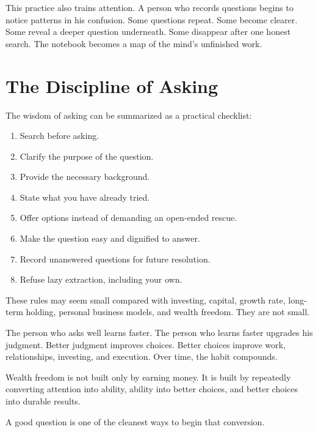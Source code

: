 This practice also trains attention. A person who records questions begins to notice patterns in his confusion. Some questions repeat. Some become clearer. Some reveal a deeper question underneath. Some disappear after one honest search. The notebook becomes a map of the mind's unfinished work.

\section*{The Discipline of Asking}

The wisdom of asking can be summarized as a practical checklist:

\begin{enumerate}
\item Search before asking.
\item Clarify the purpose of the question.
\item Provide the necessary background.
\item State what you have already tried.
\item Offer options instead of demanding an open-ended rescue.
\item Make the question easy and dignified to answer.
\item Record unanswered questions for future resolution.
\item Refuse lazy extraction, including your own.
\end{enumerate}

These rules may seem small compared with investing, capital, growth rate, long-term holding, personal business models, and wealth freedom. They are not small.

The person who asks well learns faster. The person who learns faster upgrades his judgment. Better judgment improves choices. Better choices improve work, relationships, investing, and execution. Over time, the habit compounds.

Wealth freedom is not built only by earning money. It is built by repeatedly converting attention into ability, ability into better choices, and better choices into durable results.

A good question is one of the cleanest ways to begin that conversion.
